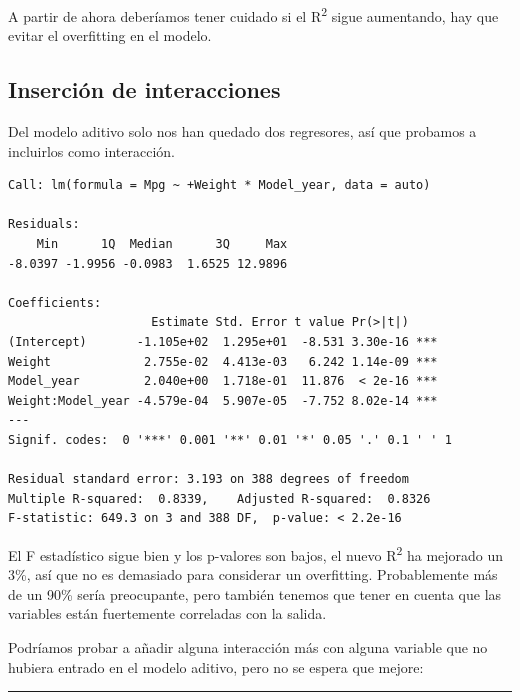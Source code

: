 \vspace{\baselineskip}

A partir de ahora deberíamos tener cuidado si el R\textsuperscript{2} sigue aumentando, hay que evitar el overfitting en el modelo.

\subsection{Inserción de interacciones}

Del modelo aditivo solo nos han quedado dos regresores, así que probamos a incluirlos como interacción.

\begin{verbatim}
Call: lm(formula = Mpg ~ +Weight * Model_year, data = auto)

Residuals:
    Min      1Q  Median      3Q     Max 
-8.0397 -1.9956 -0.0983  1.6525 12.9896 

Coefficients:
                    Estimate Std. Error t value Pr(>|t|)    
(Intercept)       -1.105e+02  1.295e+01  -8.531 3.30e-16 ***
Weight             2.755e-02  4.413e-03   6.242 1.14e-09 ***
Model_year         2.040e+00  1.718e-01  11.876  < 2e-16 ***
Weight:Model_year -4.579e-04  5.907e-05  -7.752 8.02e-14 ***
---
Signif. codes:  0 '***' 0.001 '**' 0.01 '*' 0.05 '.' 0.1 ' ' 1

Residual standard error: 3.193 on 388 degrees of freedom
Multiple R-squared:  0.8339,    Adjusted R-squared:  0.8326 
F-statistic: 649.3 on 3 and 388 DF,  p-value: < 2.2e-16
\end{verbatim}

El F estadístico sigue bien y los p-valores son bajos, el nuevo R\textsuperscript{2} ha mejorado un 3\%, así que no es demasiado para considerar un overfitting. Probablemente más de un 90\% sería preocupante, pero también tenemos que tener en cuenta que las variables están fuertemente correladas con la salida.

\vspace{\baselineskip}

Podríamos probar a añadir alguna interacción más con alguna variable que no hubiera entrado en el modelo aditivo, pero no se espera que mejore:

\begin{center}\rule{\linewidth}{0.5pt}\end{center}

